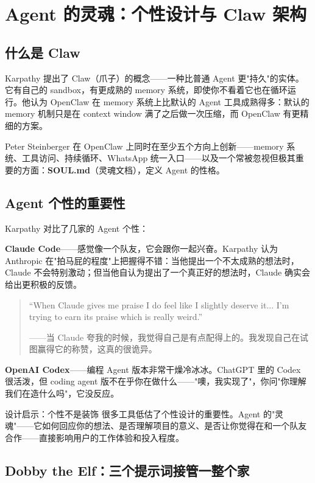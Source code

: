 \section{Agent 的灵魂：个性设计与 Claw 架构}

\subsection{什么是 Claw}

Karpathy 提出了 Claw（爪子）的概念——一种比普通 Agent 更"持久"的实体。它有自己的 sandbox，有更成熟的 memory 系统，即使你不看着它也在循环运行。他认为 OpenClaw 在 memory 系统上比默认的 Agent 工具成熟得多：默认的 memory 机制只是在 context window 满了之后做一次压缩，而 OpenClaw 有更精细的方案。

Peter Steinberger 在 OpenClaw 上同时在至少五个方向上创新——memory 系统、工具访问、持续循环、WhatsApp 统一入口——以及一个常被忽视但极其重要的方面：\textbf{SOUL.md}（灵魂文档），定义 Agent 的性格。

\subsection{Agent 个性的重要性}

Karpathy 对比了几家的 Agent 个性：

\textbf{Claude Code}——感觉像一个队友，它会跟你一起兴奋。Karpathy 认为 Anthropic 在"拍马屁的程度"上把握得不错：当他提出一个不太成熟的想法时，Claude 不会特别激动；但当他自认为提出了一个真正好的想法时，Claude 确实会给出更积极的反馈。

\begin{quote}
``When Claude gives me praise I do feel like I slightly deserve it... I'm trying to earn its praise which is really weird.''

——当 Claude 夸我的时候，我觉得自己是有点配得上的。我发现自己在试图赢得它的称赞，这真的很诡异。
\end{quote}

\textbf{OpenAI Codex}——编程 Agent 版本非常干燥冷冰冰。ChatGPT 里的 Codex 很活泼，但 coding agent 版不在乎你在做什么——"噢，我实现了"，你问"你理解我们在造什么吗"，它没反应。

\begin{importantbox}{设计启示：个性不是装饰}
很多工具低估了个性设计的重要性。Agent 的"灵魂"——它如何回应你的想法、是否理解项目的意义、是否让你觉得在和一个队友合作——直接影响用户的工作体验和投入程度。
\end{importantbox}

\subsection{Dobby the Elf：三个提示词接管一整个家}

